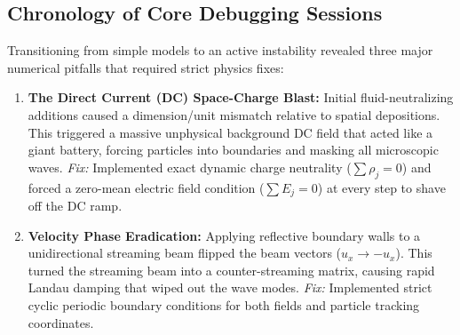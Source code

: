 \documentclass[11pt,a4paper]{article}
\begin{document}
\subsection{Chronology of Core Debugging Sessions}
Transitioning from simple models to an active instability revealed three major numerical pitfalls that required strict physics fixes:
\begin{enumerate}
    \item \textbf{The Direct Current (DC) Space-Charge Blast:} Initial fluid-neutralizing additions caused a dimension/unit mismatch relative to spatial depositions. This triggered a massive unphysical background DC field that acted like a giant battery, forcing particles into boundaries and masking all microscopic waves. \textit{Fix:} Implemented exact dynamic charge neutrality (\(\sum \rho_j = 0\)) and forced a zero-mean electric field condition (\(\sum E_j = 0\)) at every step to shave off the DC ramp.
    \item \textbf{Velocity Phase Eradication:} Applying reflective boundary walls to a unidirectional streaming beam flipped the beam vectors (\(u_x \to -u_x\)). This turned the streaming beam into a counter-streaming matrix, causing rapid Landau damping that wiped out the wave modes. \textit{Fix:} Implemented strict cyclic periodic boundary conditions for both fields and particle tracking coordinates.
\end{enumerate}
\end{document}
